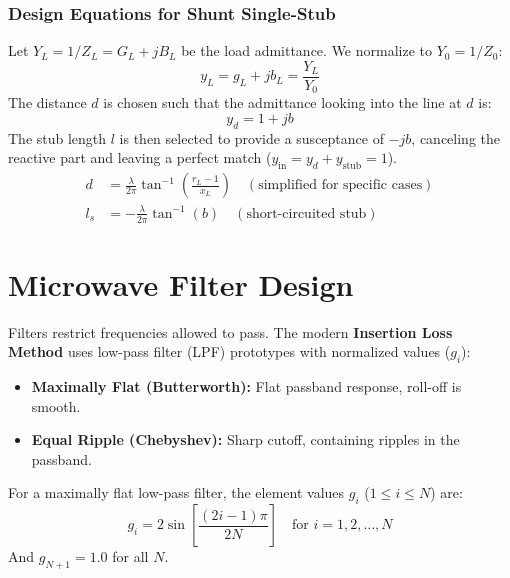 \documentclass[12pt,a4paper]{article}
\begin{document}
\subsubsection{Design Equations for Shunt Single-Stub}
Let $Y_L = 1/Z_L = G_L + j B_L$ be the load admittance. We normalize to $Y_0 = 1/Z_0$:
\begin{equation}
  y_L = g_L + j b_L = \frac{Y_L}{Y_0}
\end{equation}
The distance $d$ is chosen such that the admittance looking into the line at $d$ is:
\begin{equation}
  y_d = 1 + j b
\end{equation}
The stub length $l$ is then selected to provide a susceptance of $-j b$, canceling the reactive part and leaving a perfect match ($y_{\text{in}} = y_d + y_{\text{stub}} = 1$).
\begin{align}
  d &= \frac{\lambda}{2\pi} \tan^{-1}\left( \frac{r_L - 1}{x_L} \right) \quad (\text{simplified for specific cases}) \\
  l_s &= -\frac{\lambda}{2\pi} \tan^{-1}(b) \quad (\text{short-circuited stub})
\end{align}

\section{Microwave Filter Design}

Filters restrict frequencies allowed to pass. The modern \textbf{Insertion Loss Method} uses low-pass filter (LPF) prototypes with normalized values ($g_i$):
\begin{itemize}[leftmargin=*, itemsep=3pt]
  \item \textbf{Maximally Flat (Butterworth):} Flat passband response, roll-off is smooth.
  \item \textbf{Equal Ripple (Chebyshev):} Sharp cutoff, containing ripples in the passband.
\end{itemize}

\begin{tcolorbox}[formulabox, title={\textbf{Butterworth Prototype Values}}]
For a maximally flat low-pass filter, the element values $g_i$ ($1 \le i \le N$) are:
\begin{equation}
  g_i = 2 \sin \left[ \frac{(2i-1)\pi}{2N} \right] \quad \text{for } i = 1, 2, \dots, N
\end{equation}
And $g_{N+1} = 1.0$ for all $N$.
\end{tcolorbox}
\end{document}

